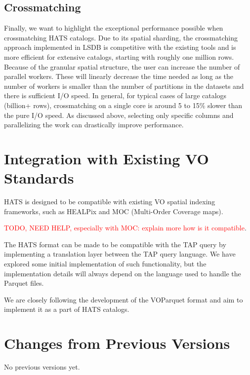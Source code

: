 \documentclass[11pt,a4paper]{ivoa}
\begin{document}
\subsection{Crossmatching}
Finally, we want to highlight the exceptional performance possible when crossmatching HATS catalogs. 
Due to its spatial sharding, the crossmatching approach implemented in LSDB is competitive with the existing tools and is more efficient for extensive catalogs, starting with roughly one million rows. 
Because of the granular spatial structure, the user can increase the number of parallel workers. 
These will linearly decrease the time needed as long as the number of workers is smaller than the number of partitions in the datasets and there is sufficient I/O speed. 
In general, for typical cases of large catalogs (billion+ rows), crossmatching on a single core is around 5 to 15\% slower than the pure I/O speed. 
As discussed above, selecting only specific columns and parallelizing the work can drastically improve performance.   

\section{Integration with Existing VO Standards}
HATS is designed to be compatible with existing VO spatial indexing frameworks, such as HEALPix and MOC (Multi-Order Coverage maps). \par
\textcolor{red}{TODO, NEED HELP, especially with MOC: explain more how is it compatible}. \par 
The HATS format can be made to be compatible with the TAP query by implementing a translation layer between the TAP query language. 
We have explored some initial implementation of such functionality, but the implementation details will always depend on the language used to handle the Parquet files. \par
We are closely following the development of the VOParquet format and aim to implement it as a part of HATS catalogs.

\appendix
\section{Changes from Previous Versions}
No previous versions yet.


\end{document}

